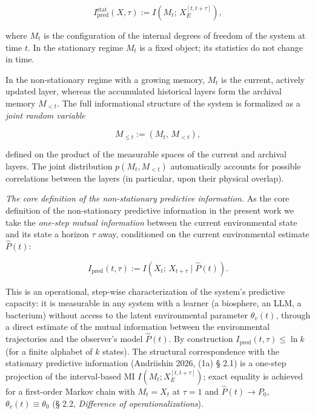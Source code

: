 \documentclass[pdflatex,sn-mathphys-ay]{sn-jnl}
\providecommand{\lt}{<}\providecommand{\gt}{>}
\begin{document}
\[I_{\text{pred}}^{\text{stat}}(X, \tau) := I\!\left(M_t;\, X_E^{[t, t+\tau]}\right),\]



where \(M_t\) is the configuration of the internal degrees of freedom of the system at time \(t\). In the stationary regime \(M_t\) is a fixed object; its statistics do not change in time.



In the non-stationary regime with a growing memory, \(M_t\) is the current, actively updated layer, whereas the accumulated historical layers form the archival memory \(M_{\lt t}\). The full informational structure of the system is formalized as a \emph{joint random variable}



\[M_{\le t} := (M_t,\, M_{\lt t}),\]



defined on the product of the measurable spaces of the current and archival layers. The joint distribution \(p(M_t, M_{\lt t})\) automatically accounts for possible correlations between the layers (in particular, upon their physical overlap).



\emph{The core definition of the non-stationary predictive information.} As the core definition of the non-stationary predictive information in the present work we take the \emph{one-step mutual information} between the current environmental state and its state a horizon \(\tau\) away, conditioned on the current environmental estimate \(\hat P(t)\):



\begin{equation}I_{\text{pred}}(t, \tau) := I\!\left(X_t;\, X_{t+\tau} \mid \hat P(t)\right). \tag{4}\end{equation}



This is an operational, step-wise characterization of the system's predictive capacity: it is measurable in any system with a learner (a biosphere, an LLM, a bacterium) without access to the latent environmental parameter \(\theta_v(t)\), through a direct estimate of the mutual information between the environmental trajectories and the observer's model \(\hat P(t)\). By construction \(I_{\text{pred}}(t, \tau) \le \ln k\) (for a finite alphabet of \(k\) states). The structural correspondence with the stationary predictive information (Andriishin 2026, (1a) § 2.1) is a one-step projection of the interval-based MI \(I(M_t; X_E^{[t,t+\tau]})\); exact equality is achieved for a first-order Markov chain with \(M_t = X_t\) at \(\tau = 1\) and \(\hat P(t) \to P_0\), \(\theta_v(t) \equiv \theta_0\) (§ 2.2, \emph{Difference of operationalizations}).
\end{document}
